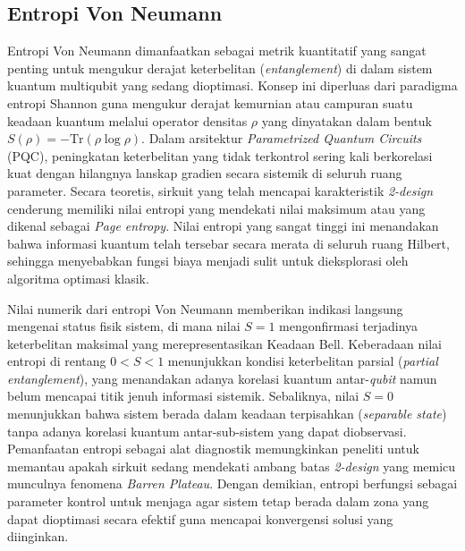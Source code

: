 \subsection{Entropi Von Neumann}
Entropi Von Neumann dimanfaatkan sebagai metrik kuantitatif yang sangat penting untuk mengukur derajat keterbelitan (\textit{entanglement}) di dalam sistem kuantum multiqubit yang sedang dioptimasi. Konsep ini diperluas dari paradigma entropi Shannon guna mengukur derajat kemurnian atau campuran suatu keadaan kuantum melalui operator densitas $\rho$ yang dinyatakan dalam bentuk $S(\rho) = -\text{Tr}(\rho \log \rho)$. Dalam arsitektur \textit{Parametrized Quantum Circuits} (PQC), peningkatan keterbelitan yang tidak terkontrol sering kali berkorelasi kuat dengan hilangnya lanskap gradien secara sistemik di seluruh ruang parameter. Secara teoretis, sirkuit yang telah mencapai karakteristik \textit{2-design} cenderung memiliki nilai entropi yang mendekati nilai maksimum atau yang dikenal sebagai \textit{Page entropy}. Nilai entropi yang sangat tinggi ini menandakan bahwa informasi kuantum telah tersebar secara merata di seluruh ruang Hilbert, sehingga menyebabkan fungsi biaya menjadi sulit untuk dieksplorasi oleh algoritma optimasi klasik.

Nilai numerik dari entropi Von Neumann memberikan indikasi langsung mengenai status fisik sistem, di mana nilai $S=1$ mengonfirmasi terjadinya keterbelitan maksimal yang merepresentasikan Keadaan Bell. Keberadaan nilai entropi di rentang $0 < S < 1$ menunjukkan kondisi keterbelitan parsial (\textit{partial entanglement}), yang menandakan adanya korelasi kuantum antar-\textit{qubit} namun belum mencapai titik jenuh informasi sistemik. Sebaliknya, nilai $S=0$ menunjukkan bahwa sistem berada dalam keadaan terpisahkan (\textit{separable state}) tanpa adanya korelasi kuantum antar-sub-sistem yang dapat diobservasi. Pemanfaatan entropi sebagai alat diagnostik memungkinkan peneliti untuk memantau apakah sirkuit sedang mendekati ambang batas \textit{2-design} yang memicu munculnya fenomena \textit{Barren Plateau}. Dengan demikian, entropi berfungsi sebagai parameter kontrol untuk menjaga agar sistem tetap berada dalam zona yang dapat dioptimasi secara efektif guna mencapai konvergensi solusi yang diinginkan.

